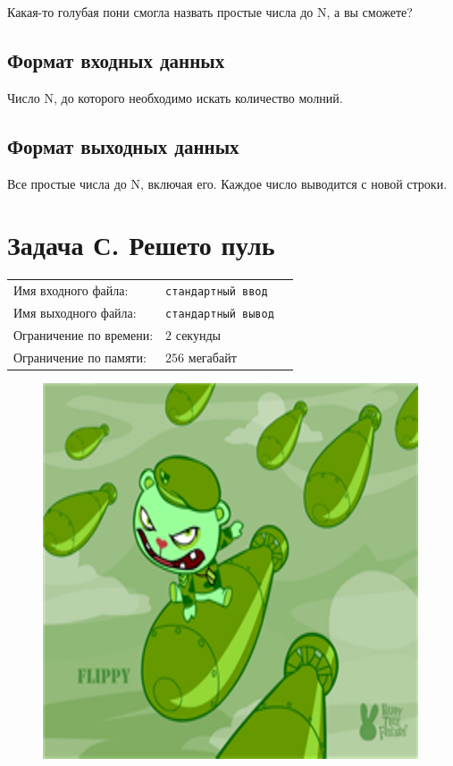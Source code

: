 \documentclass[12pt]{scrartcl}
\newcommand{\inputFile}{стандартный ввод}
\newcommand{\outputFile}{стандартный вывод}
\begin{document}
Какая-то голубая пони смогла назвать простые числа до N, а вы сможете?
 
\subsection*{Формат входных данных}
Число N, до которого необходимо искать количество молний.
\subsection*{Формат выходных данных}
Все простые числа до N, включая его. Каждое число выводится с новой строки.
\newpage

\section*{Задача С. Решето пуль}

\begin{tabularx}{\textwidth}{l l X}
    Имя входного файла: & \texttt{\inputFile} \\
    Имя выходного файла: & \texttt{\outputFile} \\
    Ограничение по времени: & $2$ секунды \\
    Ограничение по памяти: & $256$ мегабайт \\
\end{tabularx}

\begin{figure}[h]
	\centering
    \includegraphics[width=0.6\linewidth]{flippy.png}
\end{figure}
\end{document}
